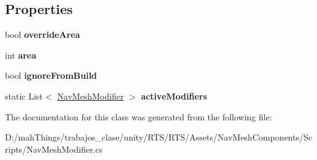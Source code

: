 \subsection*{Properties}
\begin{DoxyCompactItemize}
\item 
\mbox{\label{class_unity_engine_1_1_a_i_1_1_nav_mesh_modifier_a84a135d90246d97089f2c0f3d3ed6197}} 
bool {\bfseries override\+Area}
\item 
\mbox{\label{class_unity_engine_1_1_a_i_1_1_nav_mesh_modifier_a456a8b29136267bac460f54e6a3d5943}} 
int {\bfseries area}
\item 
\mbox{\label{class_unity_engine_1_1_a_i_1_1_nav_mesh_modifier_a43adb4e69509a139de04fadbb98a74c6}} 
bool {\bfseries ignore\+From\+Build}
\item 
\mbox{\label{class_unity_engine_1_1_a_i_1_1_nav_mesh_modifier_a30e7dd28b86964852e57fe30e00bd4f1}} 
static List$<$ \mbox{\hyperlink{class_unity_engine_1_1_a_i_1_1_nav_mesh_modifier}{Nav\+Mesh\+Modifier}} $>$ {\bfseries active\+Modifiers}
\end{DoxyCompactItemize}


The documentation for this class was generated from the following file\+:\begin{DoxyCompactItemize}
\item 
D\+:/mah\+Things/trabajos\+\_\+clase/unity/\+R\+T\+S/\+R\+T\+S/\+Assets/\+Nav\+Mesh\+Components/\+Scripts/Nav\+Mesh\+Modifier.\+cs\end{DoxyCompactItemize}
